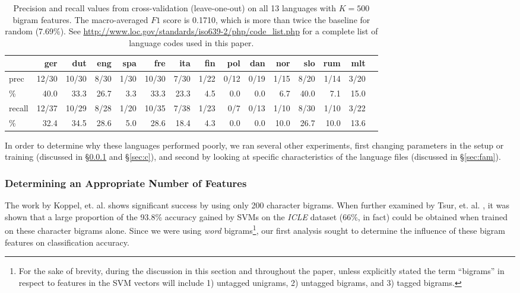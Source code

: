 \documentclass[11pt]{article}
\begin{document}
\begin{table}[tb]
\caption{Precision and recall values from cross-validation (leave-one-out) on all 13 languages with $K=500$ bigram features.  The macro-averaged $F1$ score is 0.1710, which is more than twice the baseline for random (7.69\%). See \url{http://www.loc.gov/standards/iso639-2/php/code_list.php} for a complete list of language codes used in this paper.}\label{tab:loo}
\begin{tabular}{l|rrrrrrrrrrrrrr}
 & ger & dut & eng & spa & fre & ita & fin & pol & dan & nor & slo & rum & mlt \\\hline
prec & 12/30 & 10/30 & 8/30 & 1/30 & 10/30 & 7/30 & 1/22 & 0/12 & 0/19 & 1/15 & 8/20 & 1/14 & 3/20\\
\% & 40.0 & 33.3 & 26.7 & 3.3 & 33.3 & 23.3 & 4.5 & 0.0 & 0.0 & 6.7 & 40.0 & 7.1 & 15.0\\
recall & 12/37 & 10/29 & 8/28 & 1/20 & 10/35 & 7/38 & 1/23 & 0/7 & 0/13 & 1/10 & 8/30 & 1/10 & 3/22\\
\% & 32.4 & 34.5 & 28.6 & 5.0 & 28.6 & 18.4 & 4.3 & 0.0 & 0.0 & 10.0 & 26.7 & 10.0 & 13.6
\end{tabular}
\end{table}

In order to determine why these languages performed poorly, we ran several other experiments, first changing parameters in the setup or training (discussed in \S\ref{resultsngram} and \S\ref{sec:c}), and second by looking at specific characteristics of the language files (discussed in \S\ref{sec:fam}).  

\subsubsection{Determining an Appropriate Number of Features}\label{resultsngram}
The work by Koppel, et. al.  shows significant success by using only 200 character bigrams.  When further examined by Tsur, et. al. , it was shown that a large proportion of the 93.8\% accuracy gained by SVMs on the \emph{ICLE} dataset (66\%, in fact) could be obtained when trained on these character bigrams alone.  Since we were using {\it word} bigrams\footnote{For the sake of brevity, during the discussion in this section and throughout the paper, unless explicitly stated the term ``bigrams'' in respect to features in the SVM vectors will include 1) untagged unigrams, 2) untagged bigrams, and 3) tagged bigrams.}, our first analysis sought to determine the influence of these bigram features on classification accuracy.
\end{document}
